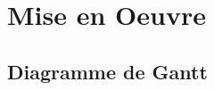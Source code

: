 \documentclass[12pt]{report}
\begin{document}
\newpage

\chapter*{Mise en Oeuvre}
\setcounter{chapter}{4}




\section{Diagramme de Gantt}



{}

\end{document}
